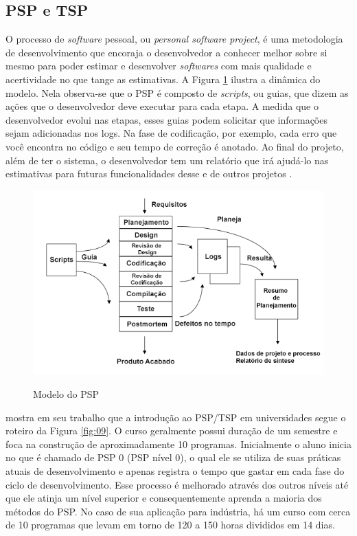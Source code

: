 \subsection{PSP e TSP}

O processo de \textit{software} pessoal, ou \textit{personal software project}, é uma metodologia de desenvolvimento que encoraja o desenvolvedor a conhecer melhor sobre si mesmo para poder estimar e desenvolver \textit{softwares} com mais qualidade e acertividade no que tange as estimativas. A Figura \ref{fig:08} ilustra a dinâmica do modelo. Nela observa-se que o PSP é composto de \textit{scripts}, ou guias, que dizem as ações que o desenvolvedor deve executar para cada etapa. A medida que o desenvolvedor evolui nas etapas, esses guias podem solicitar que informações sejam adicionadas nos logs. Na fase de codificação, por exemplo, cada erro que você encontra no código e seu tempo de correção é anotado. Ao final do projeto, além de ter o sistema, o desenvolvedor tem um relatório que irá ajudá-lo nas estimativas para futuras funcionalidades desse e de outros projetos \cite{humphrey:00}.

\begin{figure}[htb!]
\begin{center}
\caption{Modelo do PSP}
\label{fig:08}
\includegraphics[width=13cm]{assets/psp} \\
\end{center}
\end{figure}

 mostra em seu trabalho que a introdução ao PSP/TSP em universidades segue o roteiro da Figura \ref{fig:09}. O curso geralmente possui duração de um semestre e foca na construção de aproximadamente 10 programas. Inicialmente o aluno inicia no que é chamado de PSP 0 (PSP nível 0), o qual ele se utiliza de suas práticas atuais de desenvolvimento e apenas registra o tempo que gastar em cada fase do ciclo de desenvolvimento. Esse processo é melhorado através dos outros níveis até que ele atinja um nível superior e consequentemente aprenda a maioria dos métodos do PSP. No caso de sua aplicação para indústria, há um curso com cerca de 10 programas que levam em torno de 120 a 150 horas divididos em 14 dias.


